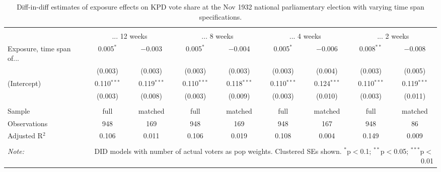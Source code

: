 
\begin{table}[!htbp] \centering 
  \caption{Diff-in-diff estimates of exposure effects on KPD vote share at the Nov 1932 national parliamentary election with varying time span specifications.\vspace{-.25cm}} 
  \label{tab:nsdap-voteshare-kpd-timespan-dd-1932-2} 
\scriptsize 
\begin{tabular}{@{\extracolsep{5pt}}lcccccccc} 
\\[-1.8ex]\hline 
\hline \\[-1.8ex] 
 & \multicolumn{2}{c}{... 12 weeks} & \multicolumn{2}{c}{... 8 weeks} & \multicolumn{2}{c}{... 4 weeks} & \multicolumn{2}{c}{... 2 weeks} \\ 
 \cmidrule(r){2-3}\cmidrule(r){4-5}\cmidrule(r){6-7}\cmidrule(r){8-9}Exposure, time span of... & 0.005$^{*}$ & $-$0.003 & 0.005$^{*}$ & $-$0.004 & 0.005$^{*}$ & $-$0.006 & 0.008$^{**}$ & $-$0.008 \\ 
  & (0.003) & (0.003) & (0.003) & (0.003) & (0.003) & (0.004) & (0.003) & (0.005) \\ 
  (Intercept) & 0.110$^{***}$ & 0.119$^{***}$ & 0.110$^{***}$ & 0.118$^{***}$ & 0.110$^{***}$ & 0.124$^{***}$ & 0.110$^{***}$ & 0.119$^{***}$ \\ 
  & (0.003) & (0.008) & (0.003) & (0.009) & (0.003) & (0.010) & (0.003) & (0.011) \\ 
 \hline \\[-1.8ex] 
Sample & full & matched & full & matched & full & matched & full & matched \\ 
Observations & 948 & 169 & 948 & 169 & 948 & 167 & 948 & 86 \\ 
Adjusted R$^{2}$ & 0.106 & 0.011 & 0.106 & 0.019 & 0.108 & 0.004 & 0.149 & 0.009 \\ 
\hline 
\hline \\[-1.8ex] 
\textit{Note:}  & \multicolumn{8}{r}{DID models with number of actual voters as pop weights. Clustered SEs shown. $^{*}$p$<$0.1; $^{**}$p$<$0.05; $^{***}$p$<$0.01} \\ 
\end{tabular} 
\end{table} 
